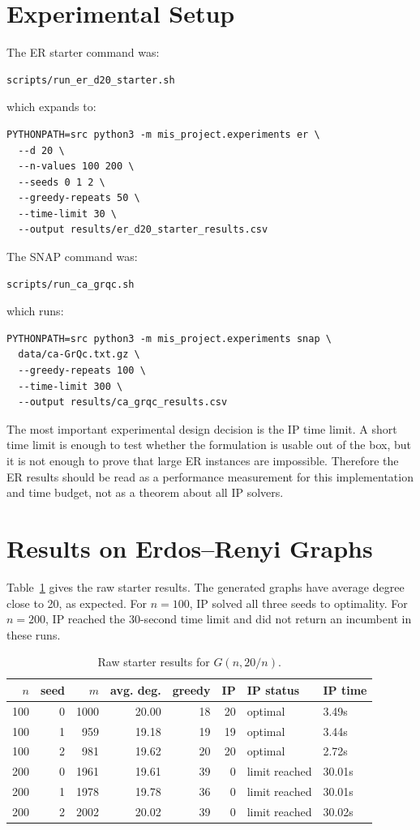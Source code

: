 \documentclass[11pt]{article}
\begin{document}
\section{Experimental Setup}

The ER starter command was:
\begin{lstlisting}[style=commands]
scripts/run_er_d20_starter.sh
\end{lstlisting}
which expands to:
\begin{lstlisting}[style=commands]
PYTHONPATH=src python3 -m mis_project.experiments er \
  --d 20 \
  --n-values 100 200 \
  --seeds 0 1 2 \
  --greedy-repeats 50 \
  --time-limit 30 \
  --output results/er_d20_starter_results.csv
\end{lstlisting}
The SNAP command was:
\begin{lstlisting}[style=commands]
scripts/run_ca_grqc.sh
\end{lstlisting}
which runs:
\begin{lstlisting}[style=commands]
PYTHONPATH=src python3 -m mis_project.experiments snap \
  data/ca-GrQc.txt.gz \
  --greedy-repeats 100 \
  --time-limit 300 \
  --output results/ca_grqc_results.csv
\end{lstlisting}

The most important experimental design decision is the IP time limit. A short
time limit is enough to test whether the formulation is usable out of the box,
but it is not enough to prove that large ER instances are impossible. Therefore
the ER results should be read as a performance measurement for this
implementation and time budget, not as a theorem about all IP solvers.

\section{Results on Erdos--Renyi Graphs}

Table~\ref{tab:er-raw} gives the raw starter results. The generated graphs have
average degree close to 20, as expected. For $n=100$, IP solved all three seeds
to optimality. For $n=200$, IP reached the 30-second time limit and did not
return an incumbent in these runs.

\begin{table}[htbp]
\centering
\caption{Raw starter results for $G(n,20/n)$.}
\label{tab:er-raw}
\begin{tabular}{rrrrrrll}
\toprule
$n$ & seed & $m$ & avg. deg. & greedy & IP & IP status & IP time \\
\midrule
100 & 0 & 1000 & 20.00 & 18 & 20 & optimal & 3.49s \\
100 & 1 &  959 & 19.18 & 19 & 19 & optimal & 3.44s \\
100 & 2 &  981 & 19.62 & 20 & 20 & optimal & 2.72s \\
200 & 0 & 1961 & 19.61 & 39 &  0 & limit reached & 30.01s \\
200 & 1 & 1978 & 19.78 & 36 &  0 & limit reached & 30.01s \\
200 & 2 & 2002 & 20.02 & 39 &  0 & limit reached & 30.02s \\
\bottomrule
\end{tabular}
\end{table}
\end{document}
